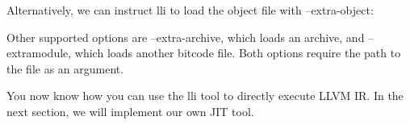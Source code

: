 Alternatively, we can instruct lli to load the object file with –extra-object:


Other supported options are –extra-archive, which loads an archive, and –extramodule, which loads another bitcode file. Both options require the path to the file as an argument.

You now know how you can use the lli tool to directly execute LLVM IR. In the next section, we will implement our own JIT tool.










